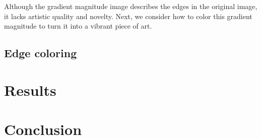 \documentclass[runningheads]{llncs}
\begin{document}
Although the gradient magnitude image describes the edges in the original image, it lacks artistic quality and novelty. Next, we consider how to color this gradient magnitude to turn it into a vibrant piece of art.

\subsection{Edge coloring}

\section{Results}

\section{Conclusion}




\end{document}
